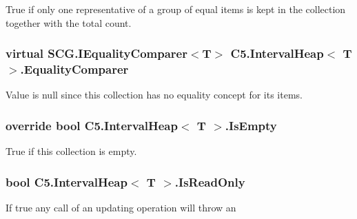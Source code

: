 True if only one representative of a group of equal items is kept in the collection together with the total count.\hypertarget{class_c5_1_1_interval_heap_a0c8af0d3e8f557d3e083513a2774676a}{}
\subsubsection[{Equality\+Comparer}]{\setlength{\rightskip}{0pt plus 5cm}virtual S\+C\+G.\+I\+Equality\+Comparer$<$T$>$ {\bf C5.\+Interval\+Heap}$<$ T $>$.Equality\+Comparer\hspace{0.3cm}{\ttfamily [get]}}\label{class_c5_1_1_interval_heap_a0c8af0d3e8f557d3e083513a2774676a}


Value is null since this collection has no equality concept for its items. 

\hypertarget{class_c5_1_1_interval_heap_aa6146324a58bb879c502a9f1cfb483a8}{}
\subsubsection[{Is\+Empty}]{\setlength{\rightskip}{0pt plus 5cm}override bool {\bf C5.\+Interval\+Heap}$<$ T $>$.Is\+Empty\hspace{0.3cm}{\ttfamily [get]}}\label{class_c5_1_1_interval_heap_aa6146324a58bb879c502a9f1cfb483a8}




True if this collection is empty.\hypertarget{class_c5_1_1_interval_heap_a0c7d60732701b904a277b1c776224fbf}{}
\subsubsection[{Is\+Read\+Only}]{\setlength{\rightskip}{0pt plus 5cm}bool {\bf C5.\+Interval\+Heap}$<$ T $>$.Is\+Read\+Only\hspace{0.3cm}{\ttfamily [get]}}\label{class_c5_1_1_interval_heap_a0c7d60732701b904a277b1c776224fbf}


If true any call of an updating operation will throw an 

